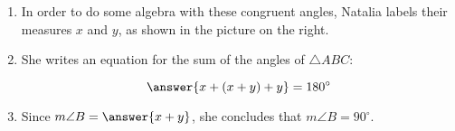 \documentclass[nooutcomes]{ximera}
\begin{document}
\begin{problem}
\begin{enumerate}
\item In order to do some algebra with these congruent angles, Natalia labels their measures $x$ and $y$, as shown in the picture on the right.  

\item She writes an equation for the sum of the angles of $\triangle ABC$: 

\[
\answer{x+(x+y)+y} = 180^\circ
\]

  
\item Since $m\angle B = \answer{x+y}$, she concludes that $m\angle B = 90^\circ$.  
\end{enumerate}
\end{problem}
\end{document}
